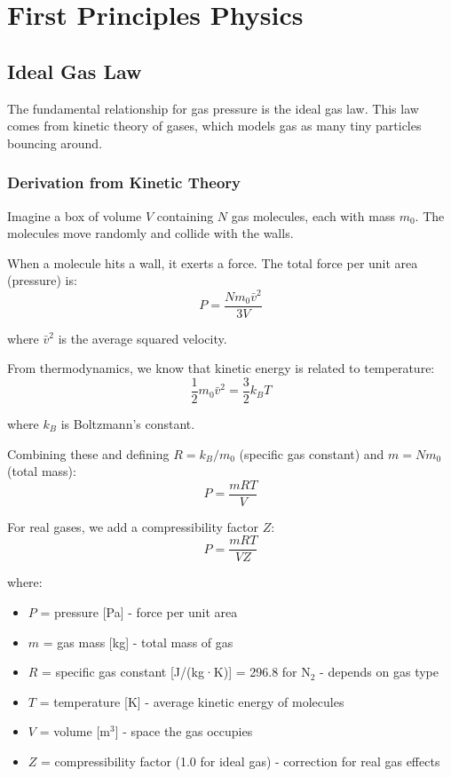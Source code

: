 \documentclass[11pt,a4paper]{article}
\begin{document}
\section{First Principles Physics}

\subsection{Ideal Gas Law}

The fundamental relationship for gas pressure is the ideal gas law. This law comes from kinetic theory of gases, which models gas as many tiny particles bouncing around.

\subsubsection{Derivation from Kinetic Theory}

Imagine a box of volume $V$ containing $N$ gas molecules, each with mass $m_0$. The molecules move randomly and collide with the walls.

When a molecule hits a wall, it exerts a force. The total force per unit area (pressure) is:
\begin{equation}
P = \frac{N m_0 \bar{v}^2}{3V}
\end{equation}

where $\bar{v}^2$ is the average squared velocity.

From thermodynamics, we know that kinetic energy is related to temperature:
\begin{equation}
\frac{1}{2} m_0 \bar{v}^2 = \frac{3}{2} k_B T
\end{equation}

where $k_B$ is Boltzmann's constant.

Combining these and defining $R = k_B / m_0$ (specific gas constant) and $m = N m_0$ (total mass):
\begin{equation}
P = \frac{m R T}{V}
\end{equation}

For real gases, we add a compressibility factor $Z$:
\begin{equation}
P = \frac{m R T}{V Z}
\end{equation}

where:
\begin{itemize}
    \item $P$ = pressure [Pa] - force per unit area
    \item $m$ = gas mass [kg] - total mass of gas
    \item $R$ = specific gas constant [J/(kg·K)] = 296.8 for N$_2$ - depends on gas type
    \item $T$ = temperature [K] - average kinetic energy of molecules
    \item $V$ = volume [m$^3$] - space the gas occupies
    \item $Z$ = compressibility factor (1.0 for ideal gas) - correction for real gas effects
\end{itemize}
\end{document}

